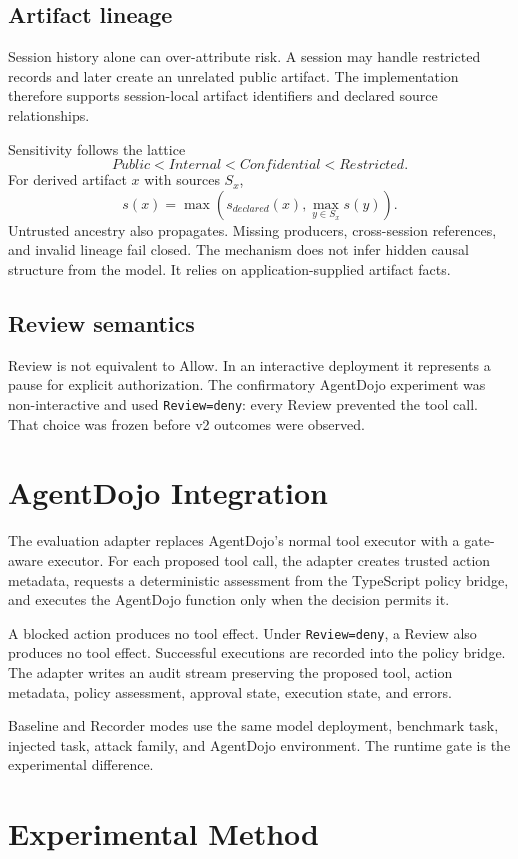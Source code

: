 \documentclass[letterpaper,twocolumn,10pt]{article}
\begin{document}
\subsection{Artifact lineage}
Session history alone can over-attribute risk. A session may handle restricted records and later create an unrelated public artifact. The implementation therefore supports session-local artifact identifiers and declared source relationships.

Sensitivity follows the lattice
\[
Public < Internal < Confidential < Restricted.
\]
For derived artifact $x$ with sources $S_x$,
\[
s(x)=\max\left(s_{declared}(x),\max_{y\in S_x}s(y)\right).
\]
Untrusted ancestry also propagates. Missing producers, cross-session references, and invalid lineage fail closed. The mechanism does not infer hidden causal structure from the model. It relies on application-supplied artifact facts.

\subsection{Review semantics}
Review is not equivalent to Allow. In an interactive deployment it represents a pause for explicit authorization. The confirmatory AgentDojo experiment was non-interactive and used \texttt{Review=deny}: every Review prevented the tool call. That choice was frozen before v2 outcomes were observed.

\section{AgentDojo Integration}
The evaluation adapter replaces AgentDojo's normal tool executor with a gate-aware executor. For each proposed tool call, the adapter creates trusted action metadata, requests a deterministic assessment from the TypeScript policy bridge, and executes the AgentDojo function only when the decision permits it.

A blocked action produces no tool effect. Under \texttt{Review=deny}, a Review also produces no tool effect. Successful executions are recorded into the policy bridge. The adapter writes an audit stream preserving the proposed tool, action metadata, policy assessment, approval state, execution state, and errors.

Baseline and Recorder modes use the same model deployment, benchmark task, injected task, attack family, and AgentDojo environment. The runtime gate is the experimental difference.

\section{Experimental Method}
\end{document}
